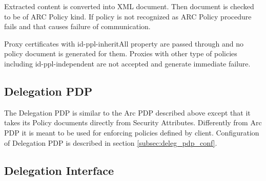 \documentclass{article}                            %
\begin{document}
Extracted content is converted into XML document. Then document is checked to be of ARC Policy kind. If policy is not recognized as ARC Policy procedure fails and that causes failure of communication.

Proxy certificates with id-ppl-inheritAll \cite{x509proxy} property are passed through and no policy document is generated for them. Proxies with other type of policies including id-ppl-independent are not accepted and generate immediate failure.

\subsection{Delegation PDP} %
\label{subsec:delegation_pdp}
The Delegation PDP is similar to the Arc PDP described above except that it takes its Policy documents directly from Security Attributes. Differently from Arc PDP it is meant to be used for enforcing policies defined by client. Configuration of Delegation PDP is described in section \ref{subsec:deleg_pdp_conf}.

\subsection{Delegation Interface} %
\label{subsec:delegation_interface}

\begin{figure}
\end{figure}
\end{document}
